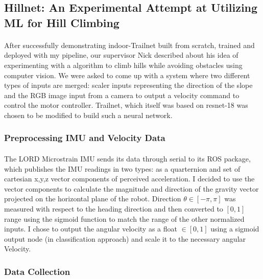 
\newpage
\subsection{Hillnet: An Experimental Attempt at Utilizing ML for Hill Climbing}

\paragraph{}
After successfully demonstrating indoor-Trailnet built from scratch, trained and deployed with my pipeline, our supervisor Nick described about his idea of experimenting with a algorithm to climb hills while avoiding obstacles using computer vision. We were asked to come up with a system where two different types of inputs are merged: scaler inputs representing the direction of the slope and the RGB image input from a camera to output a velocity command to control the motor controller. Trailnet, which itself was based on resnet-18 was chosen to be modified to build such a neural network.

\subsubsection{Preprocessing IMU and Velocity Data}

\paragraph{}
The LORD Microstrain IMU sends its data through serial to its ROS package, which publishes the IMU readings in two types: as a quarternion and set of cartesian x,y,z vector components of perceived acceleration. I decided to use the vector components to calculate the magnitude and direction of the gravity vector projected on the horizontal plane of the robot. Direction $\theta \in [-\pi, \pi]$ was measured with respect to the heading direction and then converted to $[0, 1]$ range using the sigmoid function to match the range of the other normalized inputs. I chose to output the angular velocity as a float $\in [0,1]$ using a sigmoid output node (in classification approach) and scale it to the necessary angular Velocity. 

\newpage
\subsubsection{Data Collection}

